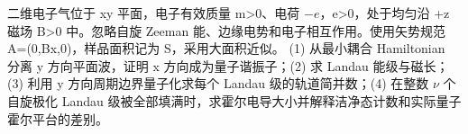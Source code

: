二维电子气位于 xy 平面，电子有效质量 m>0、电荷 \(-e\)，e>0，处于均匀沿 +z 磁场 B>0 中。忽略自旋 Zeeman 能、边缘电势和电子相互作用。使用矢势规范 A=(0,Bx,0)，样品面积记为 S，采用大面积近似。
(1) 从最小耦合 Hamiltonian 分离 y 方向平面波，证明 x 方向成为量子谐振子；(2) 求 Landau 能级与磁长；(3) 利用 y 方向周期边界量子化求每个 Landau 级的轨道简并数；(4) 在整数 \(\nu \) 个自旋极化 Landau 级被全部填满时，求霍尔电导大小并解释洁净态计数和实际量子霍尔平台的差别。
